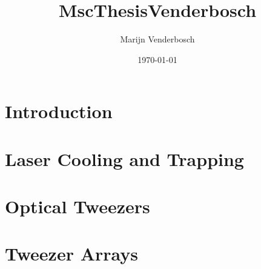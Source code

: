 \documentclass[a4paper, twoside, notitlepage, 10pt]{report}
\title{MscThesisVenderbosch}
\author{Marijn Venderbosch}
\date{\normalsize \textsf{\today}}
\begin{document}

\clearpage

    \hspace{0pt}
    \vfill
        \renewcommand{\abstractname}{\Large{Abstract}}
        \begin{abstract}
            \thispagestyle{plain}
            \vspace*{0.5cm}
            \normalsize
        \end{abstract}
    \vfill
    \vspace{100pt}
    \clearpage
    
    \hspace{0pt}
    \vfill
        \renewcommand{\abstractname}{\Large{Acknowledgments}}
        \begin{abstract}
            \thispagestyle{plain}
            \vspace*{0.5cm}
            \normalsize
        \end{abstract}
    \vfill
    \vspace{100pt}
\restoregeometry


\tableofcontents
\newpage


\newpage


\chapter{Introduction}\label{ch:introduction}
    

\chapter{Laser Cooling and Trapping}\label{ch:coolingtrapping}
    

\chapter{Optical Tweezers}\label{ch:tweezer}
    

\chapter{Tweezer Arrays}\label{ch:arrays}
    
    
\end{document}
